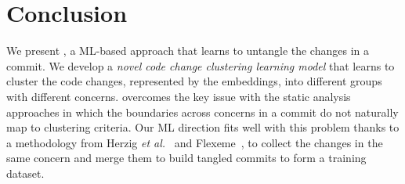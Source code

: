 \section{Conclusion}
\label{conclusion:sec}

We present {\bf \tool}, a ML-based approach that
learns to untangle the changes in a commit. We develop a {\em novel
  code change clustering learning model} that learns to cluster the
code changes, represented by the embeddings, into different groups
with different concerns. {\tool} overcomes the key issue with the
static analysis approaches in which the boundaries across concerns in
a commit do not naturally map to clustering criteria.
Our ML direction fits well with this problem thanks to a methodology
from Herzig {\em et al.}~\cite{kim-msr13} and
Flexeme~\cite{flexeme-fse20}, to collect the changes in the same
concern and merge them to build tangled commits to form a training
dataset.
